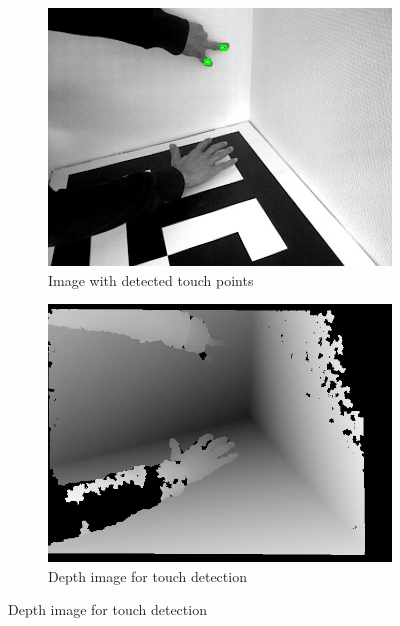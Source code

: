 \begin{figure}[htb]
        \centering
        \begin{subfigure}[b]{0.48\textwidth}
                \includegraphics[width=\textwidth]{images/software/no_touch/RGBImage165644_comob.jpg}
                \caption{Image with detected touch points}
                \label{img:rgbT}
        \end{subfigure}
    \hfill
        \begin{subfigure}[b]{0.48\textwidth}
                \includegraphics[width=\textwidth]{images/software/no_touch/actualImage.jpg}
                \caption{Depth image for touch detection}
                \label{img:depthT}
        \end{subfigure}        
               

\end{figure}
